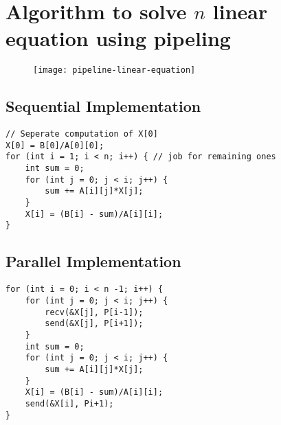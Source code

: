 \section{Algorithm to solve $ n $ linear equation using pipeling}
\begin{figure}[!htbp]
    \centering
    \texttt{[image: pipeline-linear-equation]}
\end{figure}

\subsection{Sequential Implementation}
\begin{verbatim}
// Seperate computation of X[0]
X[0] = B[0]/A[0][0]; 
for (int i = 1; i < n; i++) { // job for remaining ones
    int sum = 0;
    for (int j = 0; j < i; j++) {
        sum += A[i][j]*X[j];
    }
    X[i] = (B[i] - sum)/A[i][i];
}
\end{verbatim}

\subsection{Parallel Implementation}
\begin{verbatim}
for (int i = 0; i < n -1; i++) {
    for (int j = 0; j < i; j++) { 
        recv(&X[j], P[i-1]);
        send(&X[j], P[i+1]);
    }
    int sum = 0;
    for (int j = 0; j < i; j++) {
        sum += A[i][j]*X[j];
    }
    X[i] = (B[i] - sum)/A[i][i];
    send(&X[i], Pi+1);
}
\end{verbatim}